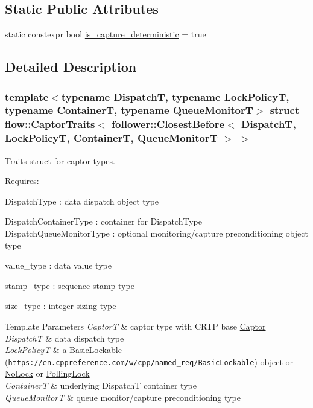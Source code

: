 \subsection*{Static Public Attributes}
\begin{DoxyCompactItemize}
\item 
static constexpr bool \hyperlink{structflow_1_1_captor_traits_3_01follower_1_1_closest_before_3_01_dispatch_t_00_01_lock_policy_t8b834bc2517b16c76af22e1a13353500_a30e638a2c1b9a6c02d59b0817a29ef62}{is\+\_\+capture\+\_\+deterministic} = true
\end{DoxyCompactItemize}


\subsection{Detailed Description}
\subsubsection*{template$<$typename DispatchT, typename Lock\+PolicyT, typename ContainerT, typename Queue\+MonitorT$>$\newline
struct flow\+::\+Captor\+Traits$<$ follower\+::\+Closest\+Before$<$ Dispatch\+T, Lock\+Policy\+T, Container\+T, Queue\+Monitor\+T $>$ $>$}

Traits struct for captor types. 

Requires\+:
\begin{DoxyItemize}
\item {\ttfamily Dispatch\+Type} \+: data dispatch object type
\item {\ttfamily Dispatch\+Container\+Type} \+: container for {\ttfamily Dispatch\+Type} {\ttfamily Dispatch\+Queue\+Monitor\+Type} \+: optional monitoring/capture preconditioning object type
\item {\ttfamily value\+\_\+type} \+: data value type
\item {\ttfamily stamp\+\_\+type} \+: sequence stamp type
\item {\ttfamily size\+\_\+type} \+: integer sizing type
\end{DoxyItemize}


\begin{DoxyTemplParams}{Template Parameters}
{\em CaptorT} & captor type with C\+R\+TP base {\ttfamily \hyperlink{classflow_1_1_captor}{Captor}}\\
\hline
{\em DispatchT} & data dispatch type \\
\hline
{\em Lock\+PolicyT} & a Basic\+Lockable (\href{https://en.cppreference.com/w/cpp/named_req/BasicLockable}{\tt https\+://en.\+cppreference.\+com/w/cpp/named\+\_\+req/\+Basic\+Lockable}) object or \hyperlink{structflow_1_1_no_lock}{No\+Lock} or \hyperlink{structflow_1_1_polling_lock}{Polling\+Lock} \\
\hline
{\em ContainerT} & underlying {\ttfamily DispatchT} container type \\
\hline
{\em Queue\+MonitorT} & queue monitor/capture preconditioning type \\
\hline
\end{DoxyTemplParams}


